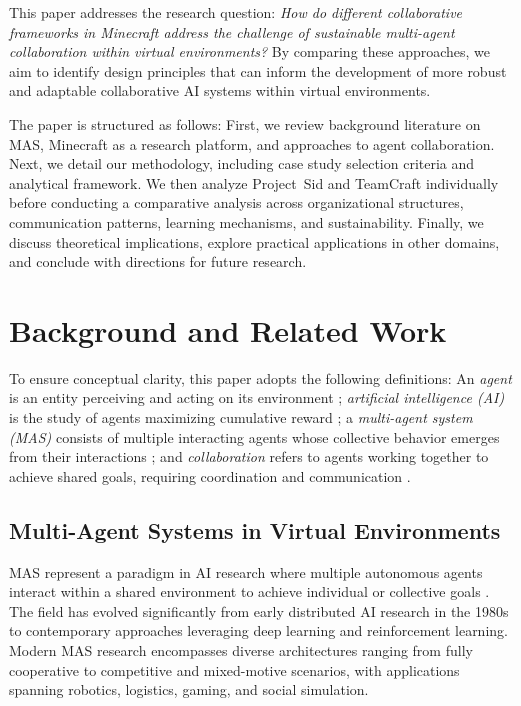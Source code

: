 \documentclass[a4paper, 12pt]{article}
\begin{document}
This paper addresses the research question: \textit{How do different collaborative frameworks in Minecraft address the challenge of sustainable multi-agent collaboration within virtual environments?} By comparing these approaches, we aim to identify design principles that can inform the development of more robust and adaptable collaborative AI systems within virtual environments.

The paper is structured as follows: First, we review background literature on MAS, Minecraft as a research platform, and approaches to agent collaboration. Next, we detail our methodology, including case study selection criteria and analytical framework. We then analyze Project~Sid and TeamCraft individually before conducting a comparative analysis across organizational structures, communication patterns, learning mechanisms, and sustainability. Finally, we discuss theoretical implications, explore practical applications in other domains, and conclude with directions for future research.

\section{Background and Related Work}

To ensure conceptual clarity, this paper adopts the following definitions: An \textit{agent} is an entity perceiving and acting on its environment \autocite{Russell2009}; \textit{artificial intelligence (AI)} is the study of agents maximizing cumulative reward \autocite{Russell2009}; a \textit{multi-agent system (MAS)} consists of multiple interacting agents whose collective behavior emerges from their interactions \autocite{Wooldridge2009}; and \textit{collaboration} refers to agents working together to achieve shared goals, requiring coordination and communication \autocite{Panait2005}.

\subsection{Multi-Agent Systems in Virtual Environments}

MAS represent a paradigm in AI research where multiple autonomous agents interact within a shared environment to achieve individual or collective goals \autocite{Leeuwen2021, Shu2024}. The field has evolved significantly from early distributed AI research in the 1980s to contemporary approaches leveraging deep learning and reinforcement learning. Modern MAS research encompasses diverse architectures ranging from fully cooperative to competitive and mixed-motive scenarios, with applications spanning robotics, logistics, gaming, and social simulation.
\end{document}
